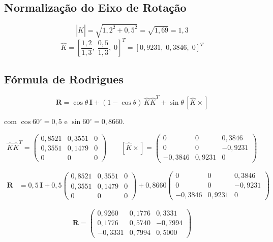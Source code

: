 \documentclass[12pt,a4paper]{article}
\newcommand{\degr}{^{\circ}}
\begin{document}
\subsection{Normalização do Eixo de Rotação}

\[
  |\hat{K}| = \sqrt{1{,}2^2 + 0{,}5^2} = \sqrt{1{,}69} = 1{,}3
\]
\[
  \hat{K} = \left[\frac{1{,}2}{1{,}3},\;\frac{0{,}5}{1{,}3},\;0\right]^T = [0{,}9231,\;0{,}3846,\;0]^T
\]

\subsection{Fórmula de Rodrigues}

\[
  \mathbf{R} = \cos\theta\,\mathbf{I} + (1-\cos\theta)\,\hat{K}\hat{K}^T + \sin\theta\,[\hat{K}\times]
\]

com $\cos 60\degr = 0{,}5$ e $\sin 60\degr = 0{,}8660$.

\[
  \hat{K}\hat{K}^T =
  \begin{pmatrix}
    0{,}8521 & 0{,}3551 & 0 \\
    0{,}3551 & 0{,}1479 & 0 \\
    0        & 0        & 0
  \end{pmatrix}
  \qquad
  [\hat{K}\times] =
  \begin{pmatrix}
    0        & 0        &  0{,}3846 \\
    0        & 0        & -0{,}9231 \\
   -0{,}3846 & 0{,}9231 &  0
  \end{pmatrix}
\]

\begin{align*}
  \mathbf{R} &= 0{,}5\,\mathbf{I}
    + 0{,}5 \begin{pmatrix} 0{,}8521 & 0{,}3551 & 0 \\ 0{,}3551 & 0{,}1479 & 0 \\ 0 & 0 & 0 \end{pmatrix}
    + 0{,}8660 \begin{pmatrix} 0 & 0 & 0{,}3846 \\ 0 & 0 & -0{,}9231 \\ -0{,}3846 & 0{,}9231 & 0 \end{pmatrix}
\end{align*}

\[
\mathbf{R} =
\begin{pmatrix}
  0{,}9260 &  0{,}1776 &  0{,}3331 \\
  0{,}1776 &  0{,}5740 & -0{,}7994 \\
 -0{,}3331 &  0{,}7994 &  0{,}5000
\end{pmatrix}
\]
\end{document}
